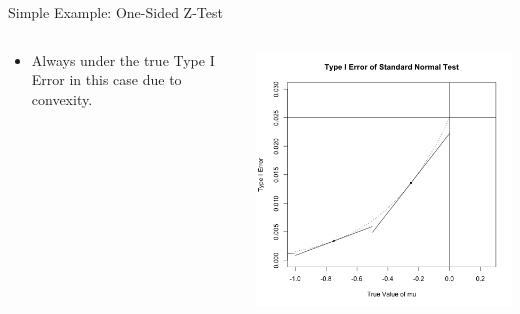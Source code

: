 \begin{frame}{Simple Example: One-Sided Z-Test}
\begin{columns}
\begin{column}{.3\textwidth}
\begin{itemize}
\item Always under the true Type I Error in this case due to convexity.
\end{itemize}
\end{column}

\begin{column}{.7\textwidth}
\includegraphics[width=\textwidth]{figures/z-test-6.png}
\end{column}
\end{columns}
\end{frame}

